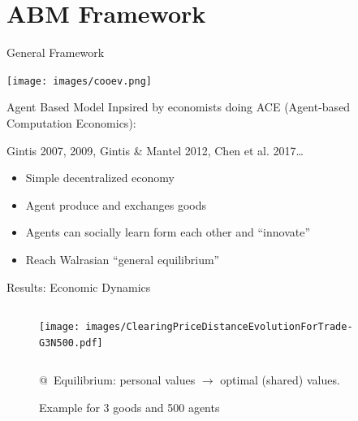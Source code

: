 \documentclass[12pt, notes=show]{beamer}
\begin{document}
\section{ABM Framework}


\begin{frame}{General Framework}
    
    \begin{center}
	\texttt{[image: images/cooev.png]}	
    \end{center}
\end{frame}

	
\begin{frame}{Agent Based Model}
    Inpsired by economists doing ACE (Agent-based Computation Economics):
    \begin{center}
	Gintis 2007, 2009, Gintis \& Mantel 2012, Chen et al. 2017\dots 
    \end{center}
    
    \begin{itemize}
	\item Simple decentralized economy
	\item Agent produce and exchanges goods
	\item Agents can socially learn form each other and ``innovate''
	\item Reach Walrasian ``general equilibrium''
    \end{itemize}
\end{frame}


\begin{frame}{Results: Economic Dynamics}
	\begin{figure}
	    \caption{Example for 3 goods and 500 agents}
	    \begin{columns}
		\texttt{[image: images/ClearingPriceDistanceEvolutionForTrade-G3N500.pdf]}\\
	    \end{columns}
		@~Equilibrium: personal values  $\rightarrow$ optimal (shared) values.
	\end{figure}
	
\end{frame}
\end{document}
